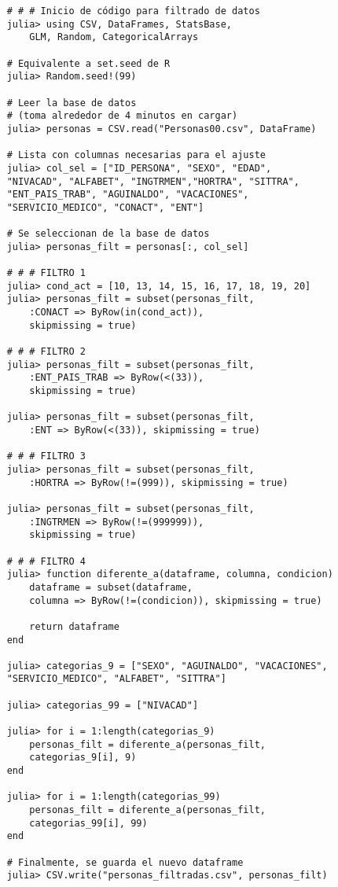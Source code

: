 \begin{verbatim}
	# # # Inicio de código para filtrado de datos
	julia> using CSV, DataFrames, StatsBase, 
		GLM, Random, CategoricalArrays

	# Equivalente a set.seed de R
	julia> Random.seed!(99)

	# Leer la base de datos 
	# (toma alrededor de 4 minutos en cargar)
	julia> personas = CSV.read("Personas00.csv", DataFrame)

	# Lista con columnas necesarias para el ajuste
	julia> col_sel = ["ID_PERSONA", "SEXO", "EDAD", 
	"NIVACAD", "ALFABET", "INGTRMEN","HORTRA", "SITTRA", 
	"ENT_PAIS_TRAB", "AGUINALDO", "VACACIONES", 
	"SERVICIO_MEDICO", "CONACT", "ENT"]
         
	# Se seleccionan de la base de datos 
	julia> personas_filt = personas[:, col_sel]    

	# # # FILTRO 1
	julia> cond_act = [10, 13, 14, 15, 16, 17, 18, 19, 20]
	julia> personas_filt = subset(personas_filt, 
		:CONACT => ByRow(in(cond_act)), 
		skipmissing = true)

	# # # FILTRO 2
	julia> personas_filt = subset(personas_filt, 
		:ENT_PAIS_TRAB => ByRow(<(33)), 
		skipmissing = true)

	julia> personas_filt = subset(personas_filt, 
		:ENT => ByRow(<(33)), skipmissing = true)

	# # # FILTRO 3
	julia> personas_filt = subset(personas_filt, 
		:HORTRA => ByRow(!=(999)), skipmissing = true)

	julia> personas_filt = subset(personas_filt, 
		:INGTRMEN => ByRow(!=(999999)), 
		skipmissing = true)

	# # # FILTRO 4
	julia> function diferente_a(dataframe, columna, condicion)
    	dataframe = subset(dataframe, 
    	columna => ByRow(!=(condicion)), skipmissing = true)
    
    	return dataframe
	end

	julia> categorias_9 = ["SEXO", "AGUINALDO", "VACACIONES", 
	"SERVICIO_MEDICO", "ALFABET", "SITTRA"]

	julia> categorias_99 = ["NIVACAD"]

	julia> for i = 1:length(categorias_9)
    	personas_filt = diferente_a(personas_filt, 
    	categorias_9[i], 9)
	end

	julia> for i = 1:length(categorias_99)
    	personas_filt = diferente_a(personas_filt, 
    	categorias_99[i], 99)
	end

	# Finalmente, se guarda el nuevo dataframe
	julia> CSV.write("personas_filtradas.csv", personas_filt)
\end{verbatim}


